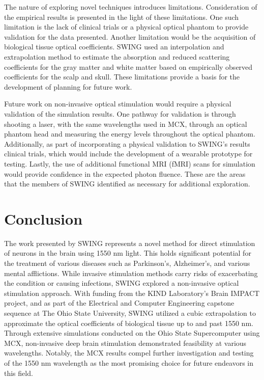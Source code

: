 \documentclass[journal,twoside,web]{ieeecolor}
\begin{document}
The nature of exploring novel techniques introduces limitations. Consideration of the empirical results is presented in the light of these limitations. One such
limitation is the lack of clinical trials or a physical optical phantom to provide validation for the data presented. Another limitation would be the acquisition
of biological tissue optical coefficients. SWING used an interpolation and extrapolation method to estimate the absorption and reduced scattering coefficients for
the gray matter and white matter based on empirically observed coefficients\cite{b5} for the scalp and skull. These limitations provide a basis for the
development of planning for future work. 

Future work on non-invasive optical stimulation would require a physical validation of the simulation results. 
One pathway for validation is through shooting a laser, with the same wavelengths used in MCX, through an optical phantom head and 
measuring the energy levels throughout the optical phantom. Additionally, as part of incorporating a physical validation to SWING's results
clinical trials, which would include the development of a wearable prototype for testing. Lastly, the use of additional functional MRI (fMRI) scans
for simulation would provide confidence in the expected photon fluence. These are the areas that the members of SWING identified as necessary for 
additional exploration.

\section{Conclusion}
\label{sec:conclusion}
The work presented by SWING represents a novel method for direct stimulation of neurons in the brain using 1550 nm light. This holds significant potential 
for the treatment of various diseases such as Parkinson's, Alzheimer's, and various mental afflictions. 
While invasive stimulation methods carry risks of exacerbating the condition or causing infections, SWING explored a non-invasive optical stimulation approach. 
With funding from the KIND Laboratory's Brain IMPACT project, and as part of the Electrical and Computer Engineering capstone sequence at The Ohio State University, 
SWING utilized a cubic extrapolation to approximate the optical coefficients of biological tissue up to and past 1550 nm. Through extensive simulations conducted on 
the Ohio State Supercomputer using MCX, non-invasive deep brain stimulation demonstrated feasibility at various wavelengths. Notably, 
the MCX results compel further investigation and testing of the 1550 nm wavelength as the most promising choice for future endeavors in this field. 
\end{document}
